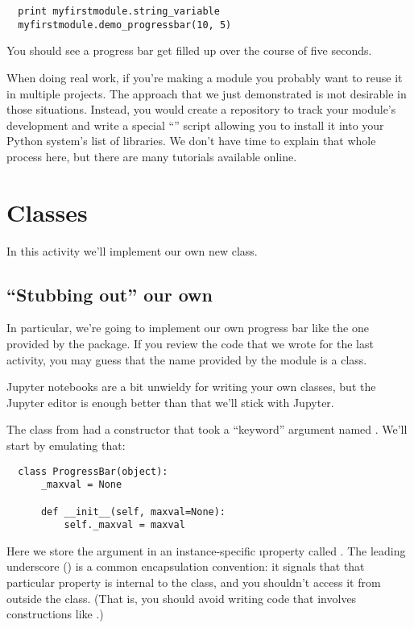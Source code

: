 \documentclass[letterpaper, 12pt, titlepage, twoside]{article}
\begin{document}
\begin{lstlisting}
  print myfirstmodule.string_variable
  myfirstmodule.demo_progressbar(10, 5)
\end{lstlisting}

You should see a progress bar get filled up over the course of five seconds.

When doing real work, if you're making a module you probably want to reuse it
in multiple projects. The approach that we just demonstrated is \i{not}
desirable in those situations. Instead, you would create a  repository
to track your module's development and write a special ``'' script
allowing you to install it into your Python system's list of libraries. We
don't have time to explain that whole process here, but there are many
tutorials available online.


\newpage
\section{Classes}

In this activity we'll implement our own new class.

\subsection*{``Stubbing out'' our own }

In particular, we're going to implement our own progress bar like the one
provided by the  package. If you review the code that we wrote
for the last activity, you may guess that the  name provided by
the  module is a class.

Jupyter notebooks are a bit unwieldy for writing your own classes, but the
Jupyter editor is enough better than  that we'll stick with Jupyter.

The  class from  had a constructor that took a
``keyword'' argument named . We'll start by emulating that:

\begin{lstlisting}
  class ProgressBar(object):
      _maxval = None

      def __init__(self, maxval=None):
          self._maxval = maxval
\end{lstlisting}

Here we store the  argument in an instance-specific \i{property}
called . The leading underscore (\s{\_}) is a common encapsulation
convention: it signals that that particular property is internal to the class,
and you shouldn't access it from outside the class. (That is, you should avoid
writing code that involves constructions like
.)
\end{document}
